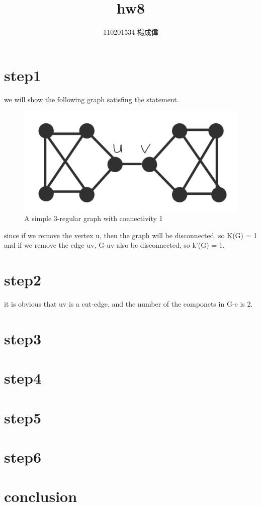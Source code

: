 \documentclass{article}
\title{hw8}
\author{110201534 楊成偉}
\date{}
\begin{document}
\begin{CJK*}{UTF8}{bkai}
\maketitle

\section*{step1}
we will show the following graph satisfing the statement.
\begin{figure}[H]
    \includegraphics[scale = 0.1]{hw8g.jpg}
    \caption{A simple 3-regular graph with connectivity 1}
\end{figure}
since if we remove the vertex u, then the graph will be disconnected. so K(G) = 1 and if we remove the edge uv, G-uv also be disconnected, so k'(G) = 1.
\section*{step2}
it is obvious that uv is a cut-edge, and the number of the componets in G-e is 2.
\section*{step3}

\section*{step4}

\section*{step5}
\section*{step6}

\section*{conclusion}

\end{CJK*}
\end{document}
